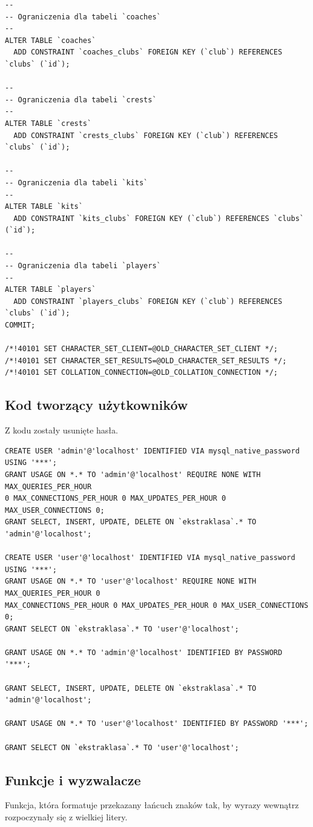 \documentclass[12pt,a4paper]{article}
\begin{document}
\begin{verbatim}
--
-- Ograniczenia dla tabeli `coaches`
--
ALTER TABLE `coaches`
  ADD CONSTRAINT `coaches_clubs` FOREIGN KEY (`club`) REFERENCES `clubs` (`id`);

--
-- Ograniczenia dla tabeli `crests`
--
ALTER TABLE `crests`
  ADD CONSTRAINT `crests_clubs` FOREIGN KEY (`club`) REFERENCES `clubs` (`id`);

--
-- Ograniczenia dla tabeli `kits`
--
ALTER TABLE `kits`
  ADD CONSTRAINT `kits_clubs` FOREIGN KEY (`club`) REFERENCES `clubs` (`id`);

--
-- Ograniczenia dla tabeli `players`
--
ALTER TABLE `players`
  ADD CONSTRAINT `players_clubs` FOREIGN KEY (`club`) REFERENCES `clubs` (`id`);
COMMIT;

/*!40101 SET CHARACTER_SET_CLIENT=@OLD_CHARACTER_SET_CLIENT */;
/*!40101 SET CHARACTER_SET_RESULTS=@OLD_CHARACTER_SET_RESULTS */;
/*!40101 SET COLLATION_CONNECTION=@OLD_COLLATION_CONNECTION */;

    \end{verbatim}{}
    
    \subsection{Kod tworzący użytkowników}
    Z kodu zostały usunięte hasła.
    \begin{verbatim}
CREATE USER 'admin'@'localhost' IDENTIFIED VIA mysql_native_password USING '***';
GRANT USAGE ON *.* TO 'admin'@'localhost' REQUIRE NONE WITH MAX_QUERIES_PER_HOUR 
0 MAX_CONNECTIONS_PER_HOUR 0 MAX_UPDATES_PER_HOUR 0 MAX_USER_CONNECTIONS 0;
GRANT SELECT, INSERT, UPDATE, DELETE ON `ekstraklasa`.* TO 'admin'@'localhost';

CREATE USER 'user'@'localhost' IDENTIFIED VIA mysql_native_password USING '***';
GRANT USAGE ON *.* TO 'user'@'localhost' REQUIRE NONE WITH MAX_QUERIES_PER_HOUR 0 
MAX_CONNECTIONS_PER_HOUR 0 MAX_UPDATES_PER_HOUR 0 MAX_USER_CONNECTIONS 0;
GRANT SELECT ON `ekstraklasa`.* TO 'user'@'localhost';

GRANT USAGE ON *.* TO 'admin'@'localhost' IDENTIFIED BY PASSWORD '***';

GRANT SELECT, INSERT, UPDATE, DELETE ON `ekstraklasa`.* TO 'admin'@'localhost';

GRANT USAGE ON *.* TO 'user'@'localhost' IDENTIFIED BY PASSWORD '***';

GRANT SELECT ON `ekstraklasa`.* TO 'user'@'localhost';
\end{verbatim}{}

    \subsection{Funkcje i wyzwalacze}
    Funkcja, która formatuje przekazany łańcuch znaków tak, by wyrazy wewnątrz rozpoczynały się z wielkiej litery.
    
\end{document}
